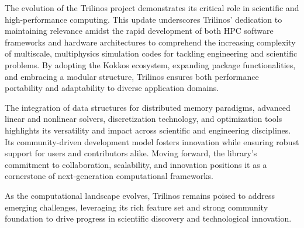 
The evolution of the Trilinos project demonstrates its critical role in scientific and high-performance computing.
This update underscores Trilinos’ dedication to maintaining relevance amidst the rapid development of both HPC software frameworks and hardware architectures
to comprehend the increasing complexity of multiscale, multiphysics simulation codes for tackling engineering and scientific problems.
By adopting the Kokkos ecosystem, expanding package functionalities, and embracing a modular structure,
Trilinos ensures both performance portability and adaptability to diverse application domains.

The integration of data structures for distributed memory paradigms, advanced linear and nonlinear solvers, discretization technology, and optimization tools highlights its versatility and impact across scientific and engineering disciplines.
Its community-driven development model fosters innovation while ensuring robust support for users and contributors alike.
Moving forward, the library’s commitment to collaboration, scalability, and innovation positions it as a cornerstone of next-generation computational frameworks.

As the computational landscape evolves, Trilinos remains poised to address emerging challenges, leveraging its rich feature set and strong community foundation to drive progress in scientific discovery and technological innovation.